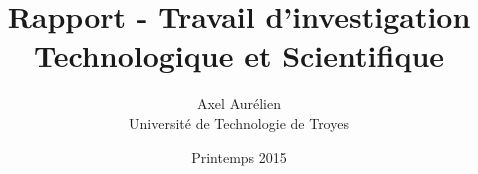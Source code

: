 \documentclass[11pt]{report}
\title{Rapport - Travail d'investigation Technologique et Scientifique}
\author{Axel \bsc{Mousset} Aurélien \bsc{Labate} \\ Université de Technologie de Troyes}
\date{Printemps 2015}
\begin{document}
    \maketitle
    
    \tableofcontents

    
    
    
    
    
    
    

    \appendix
    

    \nocite{*}
    
    
\end{document}
